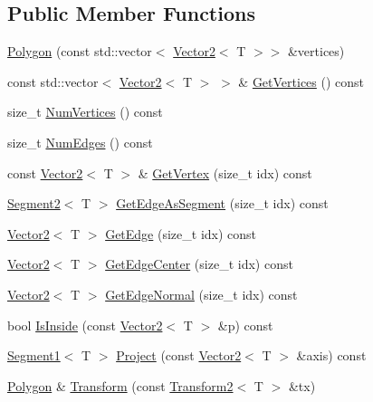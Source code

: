 \subsection*{Public Member Functions}
\begin{DoxyCompactItemize}
\item 
\hyperlink{classastu_1_1Polygon_a673a02de1ae66a4c4d3d03c79a842467}{Polygon} (const std\+::vector$<$ \hyperlink{classastu_1_1Vector2}{Vector2}$<$ T $>$$>$ \&vertices)
\item 
const std\+::vector$<$ \hyperlink{classastu_1_1Vector2}{Vector2}$<$ T $>$ $>$ \& \hyperlink{classastu_1_1Polygon_aa96aa72691eac81bf46d4e0ac2109a46}{Get\+Vertices} () const
\item 
size\+\_\+t \hyperlink{classastu_1_1Polygon_aaabad8e95da96f4fa2e8d0fd79804afa}{Num\+Vertices} () const
\item 
size\+\_\+t \hyperlink{classastu_1_1Polygon_a752836abe5a71f78c8a9debfcffc580e}{Num\+Edges} () const
\item 
const \hyperlink{classastu_1_1Vector2}{Vector2}$<$ T $>$ \& \hyperlink{classastu_1_1Polygon_ad06d8f363e793f0b6b44af115330d26c}{Get\+Vertex} (size\+\_\+t idx) const
\item 
\hyperlink{classastu_1_1Segment2}{Segment2}$<$ T $>$ \hyperlink{classastu_1_1Polygon_af52218667a41061353fb5b98b858d1da}{Get\+Edge\+As\+Segment} (size\+\_\+t idx) const
\item 
\hyperlink{classastu_1_1Vector2}{Vector2}$<$ T $>$ \hyperlink{classastu_1_1Polygon_ac947a4d49a9b43c76169559c4475ef96}{Get\+Edge} (size\+\_\+t idx) const
\item 
\hyperlink{classastu_1_1Vector2}{Vector2}$<$ T $>$ \hyperlink{classastu_1_1Polygon_a701964e09156820469360faa0eb70160}{Get\+Edge\+Center} (size\+\_\+t idx) const
\item 
\hyperlink{classastu_1_1Vector2}{Vector2}$<$ T $>$ \hyperlink{classastu_1_1Polygon_aeb8ca6b2c43a3b400e2cac7ec5d01770}{Get\+Edge\+Normal} (size\+\_\+t idx) const
\item 
bool \hyperlink{classastu_1_1Polygon_ae58759a339e629b9a0b2016f5a959cc1}{Is\+Inside} (const \hyperlink{classastu_1_1Vector2}{Vector2}$<$ T $>$ \&p) const
\item 
\hyperlink{classastu_1_1Segment1}{Segment1}$<$ T $>$ \hyperlink{classastu_1_1Polygon_a5e449c044ceeeb1e459dbb00a301254c}{Project} (const \hyperlink{classastu_1_1Vector2}{Vector2}$<$ T $>$ \&axis) const
\item 
\hyperlink{classastu_1_1Polygon}{Polygon} \& \hyperlink{classastu_1_1Polygon_a9bf40bc43bd08d4293583c146bab4d68}{Transform} (const \hyperlink{classastu_1_1Transform2}{Transform2}$<$ T $>$ \&tx)
\end{DoxyCompactItemize}


